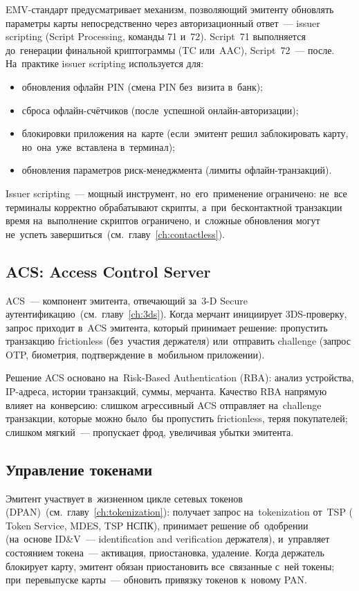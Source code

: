 EMV-стандарт предусматривает механизм, позволяющий эмитенту
обновлять параметры карты непосредственно через авторизационный
ответ~--- issuer scripting (Script Processing, команды
71 и~72). Script~71 выполняется до~генерации финальной
криптограммы (TC или~AAC), Script~72~--- после. На~практике
issuer scripting используется для:

\begin{itemize}
  \item обновления офлайн PIN (смена PIN без~визита в~банк);
  \item сброса офлайн-счётчиков (после~успешной онлайн-авторизации);
  \item блокировки приложения на~карте (если~эмитент решил
        заблокировать карту, но~она~уже~вставлена в~терминал);
  \item обновления параметров риск-менеджмента (лимиты
        офлайн-транзакций).
\end{itemize}

Issuer scripting~--- мощный инструмент, но~его~применение
ограничено: не~все терминалы корректно обрабатывают скрипты,
а~при~бесконтактной транзакции время на~выполнение скриптов
ограничено, и~сложные обновления могут не~успеть
завершиться~(см.~главу~\ref{ch:contactless}).

\subsection*{ACS: Access Control Server}

ACS~--- компонент эмитента, отвечающий за~3-D Secure
аутентификацию~(см.~главу~\ref{ch:3ds}). Когда мерчант
инициирует 3DS-проверку, запрос приходит в~ACS эмитента,
который принимает решение: пропустить транзакцию frictionless
(без~участия держателя) или~отправить challenge (запрос
OTP, биометрия, подтверждение в~мобильном приложении).

Решение ACS основано на~Risk-Based Authentication (RBA):
анализ устройства, IP-адреса, истории транзакций, суммы,
мерчанта. Качество RBA напрямую влияет на~конверсию: слишком
агрессивный ACS отправляет на~challenge транзакции, которые
можно было~бы пропустить frictionless, теряя покупателей;
слишком мягкий~--- пропускает фрод, увеличивая убытки
эмитента.

\subsection*{Управление токенами}

Эмитент участвует в~жизненном цикле сетевых токенов
(DPAN)~(см.~главу~\ref{ch:tokenization}): получает запрос
на~tokenization от~TSP ( Token Service, MDES,
TSP НСПК), принимает решение об~одобрении (на~основе
ID\&V~--- identification and verification держателя),
и~управляет состоянием токена~--- активация, приостановка,
удаление. Когда держатель блокирует карту, эмитент обязан
приостановить все~связанные с~ней токены; при~перевыпуске
карты~--- обновить привязку токенов к~новому PAN.

